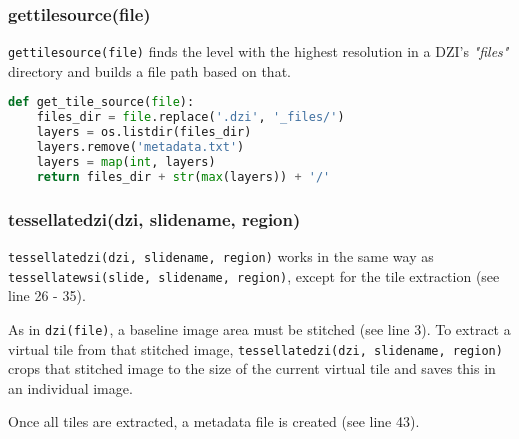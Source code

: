 \subsubsection{get{\textunderscore}tile{\textunderscore}source(file)}
\texttt{get{\textunderscore}tile{\textunderscore}source(file)} finds the level with the highest resolution in a DZI's \emph{"{\textunderscore}files"} directory and builds a file path based on that.

\begin{lstlisting}[frame=single,language=python]
def get_tile_source(file):
	files_dir = file.replace('.dzi', '_files/')
	layers = os.listdir(files_dir)
	layers.remove('metadata.txt')
	layers = map(int, layers)
	return files_dir + str(max(layers)) + '/'
\end{lstlisting}


\subsubsection{tessellate{\textunderscore}dzi(dzi, slide{\textunderscore}name, region)}
\texttt{tessellate{\textunderscore}dzi(dzi, slide{\textunderscore}name, region)} works in the same way as \texttt{tessellate{\textunderscore}wsi(slide, slide{\textunderscore}name, region)}, except for the tile extraction (see line 26 - 35).

As in \texttt{dzi(file)}, a baseline image area must be stitched (see line 3). To extract a virtual tile from that stitched image, \texttt{tessellate{\textunderscore}dzi(dzi, slide{\textunderscore}name, region)} crops that stitched image to the size of the current virtual tile and saves this in an individual image.

Once all tiles are extracted, a metadata file is created (see line 43).

